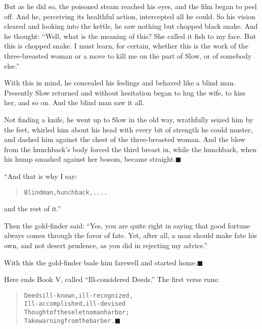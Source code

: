 \documentclass[article, twoside, 14pt]{memoir}
\newcommand{\qed}{\hfill \ensuremath{\blacksquare}}
\renewenvironment{verbatim}{%
\begin{quote}%
\vskip -10pt%
\begin{alltt}\normalfont\large}{\end{alltt}%
\end{quote}%
\vskip -10pt
} %
\begin{document}
But as he did so, the poisoned steam reached his eyes, and the film
began to peel off. And he, perceiving its healthful action,
intercepted all he could. So his vision cleared and looking into
the kettle, he saw nothing but chopped black snake. And he thought:
``Well, what is the meaning of this? She called it fish to my face. But this is chopped snake. I must learn, for certain, whether this is the work of the three-breasted woman or a move to kill me on the part of Slow, or of somebody else.''

With this in mind, he concealed his feelings and behaved like a
blind man. Presently Slow returned and without hesitation began to
hug the wife, to kiss her, and so on. And the blind man saw it all.


Not finding a knife, he went up to Slow in the old way, wrathfully
seized him by the feet, whirled him about his head with every bit
of strength he could muster, and dashed him against the chest of
the three-breasted woman. And the blow from the hunchback's body
forced the third breast in, while the hunchback, when his hump
smashed against her bosom, became straight.\hyperref[s89]{\qed}

“And that is why I say:

\begin{verbatim}
Blind man, hunchback, . . . .
\end{verbatim}
and the rest of it.”

Then the gold-finder said:
``Yes, you are quite right in saying that good fortune always comes through the favor of fate. Yet, after all, a man should make fate his own, and not desert prudence, as you did in rejecting my advice.''

With this the gold-finder bade him farewell and started
home.\hyperref[s81]{\qed}

Here ends Book V, called ``Ill-considered Deeds.'' The first verse
runs:

\begin{verbatim}
Deeds ill-known, ill-recognized,
Ill-accomplished, ill-devised{\textemdash}
Thought of these let no man harbor;
Take warning from the barber.\hyperref[s80]{\qed}
\end{verbatim}
\end{document}
